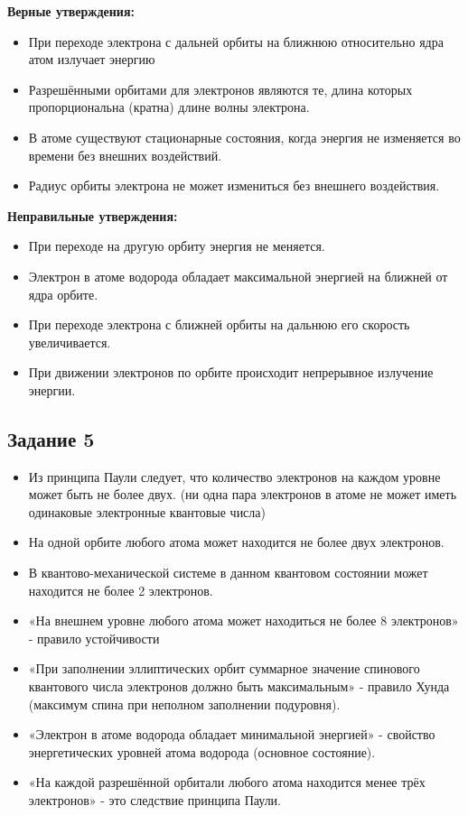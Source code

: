 \documentclass[../main.tex]{subfiles}
\begin{document}
\textbf{Верные утверждения:}
\begin{itemize}
    \item При переходе электрона с дальней орбиты на ближнюю относительно ядра атом излучает энергию
    \item Разрешёнными орбитами для электронов являются те, длина которых пропорциональна (кратна) длине волны электрона.
    \item В атоме существуют стационарные состояния, когда энергия не изменяется во времени без внешних воздействий.
    \item Радиус орбиты электрона не может измениться без внешнего воздействия.
\end{itemize}

\textbf{Неправильные утверждения:}
\begin{itemize}
    \item При переходе на другую орбиту энергия не меняется.
    \item Электрон в атоме водорода обладает максимальной энергией на ближней от ядра орбите.
    \item При переходе электрона с ближней орбиты на дальнюю его скорость увеличивается.
    \item При движении электронов по орбите происходит непрерывное излучение энергии.
\end{itemize}

\subsection{Задание 5}
\begin{itemize}
    \item Из принципа Паули следует, что количество электронов на каждом уровне может быть не более двух. (ни одна пара электронов в атоме не может иметь одинаковые электронные квантовые числа)
    \item На одной орбите любого атома может находится не более двух электронов.
    \item В квантово-механической системе в данном квантовом состоянии может находится не более 2 электронов.
    \item «На внешнем уровне любого атома может находиться не более 8 электронов» - правило устойчивости
    \item «При заполнении эллиптических орбит суммарное значение спинового квантового числа электронов должно быть максимальным» - правило Хунда (максимум спина при неполном заполнении подуровня).
    \item «Электрон в атоме водорода обладает минимальной энергией» - свойство энергетических уровней атома водорода (основное состояние).
    \item «На каждой разрешённой орбитали любого атома находится менее трёх электронов» - это следствие принципа Паули.
\end{itemize}
\end{document}
